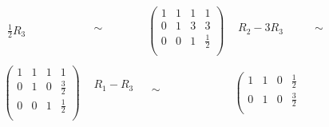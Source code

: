 \documentclass[tikz, 12pt]{scrartcl}
\begin{document}
\begin{equation}
\begin{split}
\begin{array}{cccccc}
\begin{array}{c}
								 \\
					\frac{1}{2}R_3 		\\
					\end{array}
					&
					\begin{array}{c}
					 \\
					 \sim\\
					 \\
					\end{array}
					&
					\left(
					\begin{array}{ccc|c}
						1	&	1	&	1	&	1 \\
						0	&	1	&	3	&	3 \\
						0	&	0	&	1	&	\frac{1}{2}\\
					\end{array}
					\right)
					&
					\begin{array}{c}
								\\
					R_2 - 3R_3			 \\
						\\
					\end{array}
					&
					\begin{array}{c}
					 \\
					 \sim\\
					 \\
					\end{array}
					\\
					\\
					\left(
					\begin{array}{ccc|c}
						1	&	1	&	1	&	1 \\
						0	&	1	&	0	&	\frac{3}{2} \\
						0	&	0	&	1	&	\frac{1}{2} \\
					\end{array}
					\right)
					&
					\begin{array}{c}
					R_1 - R_3				\\
								 \\
							\\
					\end{array}
					&
					\begin{array}{c}
					 \\
					 \sim\\
					 \\
					\end{array}
					&
					\left(
					\begin{array}{ccc|c}
						1	&	1	&	0	&	\frac{1}{2} \\
						0	&	1	&	0	&	\frac{3}{2} \\

\end{array}
\end{array}
\end{split}
\end{equation}
\end{document}
